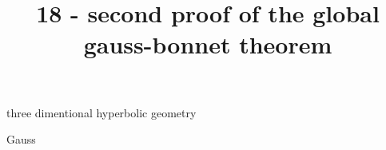 \documentclass{article}
\title{18 - second proof of the global gauss-bonnet theorem}
\newenvironment{andrew_section}[1]
    {
    \section{#1}
    \begin{itemize}
    }
    {
    \end{itemize}
    }
\begin{document}
\maketitle

\begin{andrew_section}{three dimentional hyperbolic geometry}
    \item 
        Gauss
\end{andrew_section}
\end{document}
